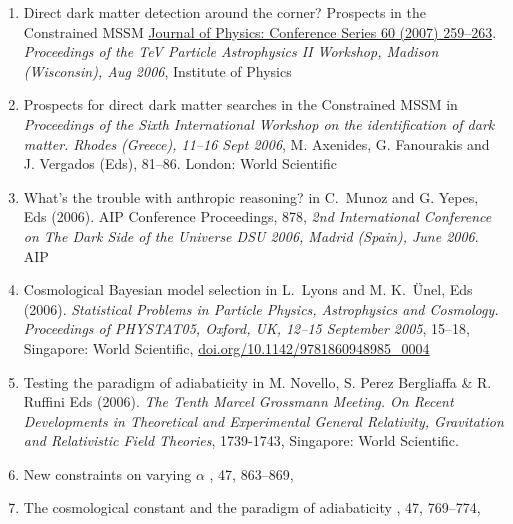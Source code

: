 \begin{enumerate}
\item 
{}
{Direct dark matter detection around the corner? Prospects in the Constrained MSSM}
{\href{https://iopscience.iop.org/issue/1742-6596/60/1}{Journal of Physics: Conference Series 60 (2007) 259–263}. {\em Proceedings of the TeV Particle Astrophysics II Workshop, Madison (Wisconsin), Aug 2006}, Institute of Physics}

\item 
{}
{Prospects for direct dark matter searches in the Constrained MSSM}
{in {\em Proceedings of the Sixth International Workshop on the identification of dark matter. Rhodes (Greece), 11–16 Sept 2006}, M. Axenides, G. Fanourakis and J. Vergados (Eds), 81–86. London: World Scientific}

\item
{}
{What's the trouble with anthropic reasoning?}
{in C.~Munoz and G. Yepes, Eds (2006). AIP Conference Proceedings, 878, {\em 2nd International Conference on The Dark Side of the Universe DSU 2006, Madrid (Spain), June 2006}. AIP }


\item
{}
{Cosmological Bayesian model selection}
{in L.~Lyons and M. K.~\"Unel, Eds (2006). {\em Statistical Problems in Particle Physics, Astrophysics and Cosmology. Proceedings of PHYSTAT05, Oxford, UK, 12–15 September 2005}, 15–18, Singapore: World Scientific, \href{https://doi.org/10.1142/9781860948985_0004}{doi.org/10.1142/9781860948985\_0004}}

\item 
{}
{Testing the paradigm of adiabaticity}
{in M. Novello, S. Perez Bergliaffa \& R. Ruffini Eds (2006). {\em The Tenth Marcel Grossmann Meeting. On Recent Developments in Theoretical and Experimental General Relativity, Gravitation and Relativistic Field Theories}, 1739-1743, Singapore: World Scientific.  }

\item 
{}
{New constraints on varying $\alpha$}
{\NAR, 47, 863–869, }

\item
{}
{The cosmological constant and the paradigm of adiabaticity}
{\NAR, 47, 769–774, }
\end{enumerate}
\setcounter{nProceedings}{\value{enumi}}

